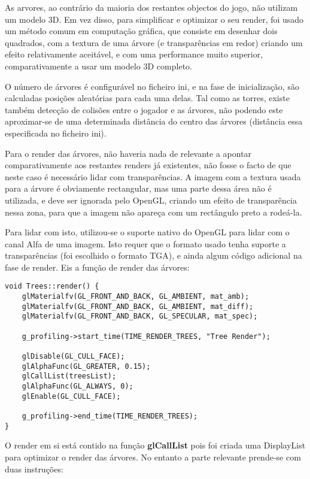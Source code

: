 As arvores, ao contrário da maioria dos restantes objectos do jogo, não utilizam um modelo 3D. Em vez disso, para simplificar e optimizar o seu render, foi usado um método comum em computação gráfica, que consiste em desenhar dois quadrados, com a textura de uma árvore (e transparências em redor) criando um efeito relativamente aceitável, e com uma performance muito superior, comparativamente a usar um modelo 3D completo.

O número de árvores é configurável no ficheiro ini, e na fase de inicialização, são calculadas posições aleatórias para cada uma delas. Tal como as torres, existe também detecção de colisões entre o jogador e as árvores, não podendo este aproximar-se de uma determinada distância do centro das árvores (distância essa especificada no ficheiro ini).

Para o render das árvores, não haveria nada de relevante a apontar comparativamente aos restantes renders já existentes, não fosse o facto de que neste caso é necessário lidar com transparências. A imagem com a textura usada para a árvore é obviamente rectangular, mas uma parte dessa área não é utilizada, e deve ser ignorada pelo OpenGL, criando um efeito de transparência nessa zona, para que a imagem não apareça com um rectângulo preto a rodeá-la.

Para lidar com isto, utilizou-se o suporte nativo do OpenGL para lidar com o canal Alfa de uma imagem. Isto requer que o formato usado tenha suporte a transparências (foi escolhido o formato TGA), e ainda algum código adicional na fase de render. Eis a função de render das árvores:

\begin{lstlisting}
void Trees::render() {
	glMaterialfv(GL_FRONT_AND_BACK, GL_AMBIENT, mat_amb);
	glMaterialfv(GL_FRONT_AND_BACK, GL_AMBIENT, mat_diff);
	glMaterialfv(GL_FRONT_AND_BACK, GL_SPECULAR, mat_spec);

	g_profiling->start_time(TIME_RENDER_TREES, "Tree Render");
	
	glDisable(GL_CULL_FACE);
	glAlphaFunc(GL_GREATER, 0.15);
	glCallList(treesList);
	glAlphaFunc(GL_ALWAYS, 0);
	glEnable(GL_CULL_FACE);
	
	g_profiling->end_time(TIME_RENDER_TREES);
}
\end{lstlisting}

O render em si está contido na função \textbf{glCallList} pois foi criada uma DisplayList para optimizar o render das árvores. No entanto a parte relevante prende-se com duas instruções:

